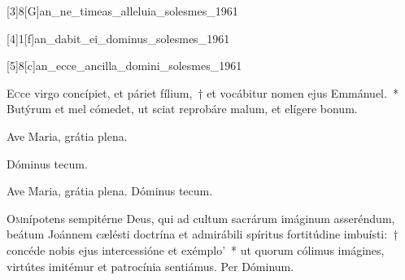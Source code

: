 \documentclass[vesperale_romanum.tex]{subfiles}
\begin{document}
[3]{8}[G]{an_ne_timeas_alleluia_solesmes_1961}

[4]{1}[f]{an_dabit_ei_dominus_solesmes_1961}

[5]{8}[c]{an_ecce_ancilla_domini_solesmes_1961}


\lettrine{E}{c}ce virgo concípiet, et páriet fílium,~† et vocábitur nomen ejus Emmánuel.~* Butýrum et mel cómedet, ut sciat reprobáre malum, et elígere bonum.

\amsrubrique%

\vv Ave Maria, grátia plena.

\rr Dóminus tecum.


\label{or_25_mar} \oratio



\commferiae

\bmvtone


\omniapraeter

\vv Ave Maria, grátia plena. \rr Dóminus tecum.


\myrule


\duplexmtv


\oratio

\lettrine{O}{m}nípotens sempitérne Deus, qui ad cultum sacrárum imáginum asseréndum, beátum Joánnem cælésti doctrína et admirábili spíritus fortitúdine imbuísti:~† concéde nobis ejus intercessióne et exémplo'~* ut quorum cólimus imágines, virtútes imitémur et patrocínia sentiámus.
Per Dóminum.

\commferiae


\myrule
\end{document}
